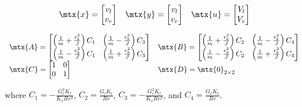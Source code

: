\begin{theorem}
  \label{thm:ramsete_decoupled_ref_tracker}
  \begin{equation*}
    \begin{array}{ccc}
      \mtx{x} =
      \begin{bmatrix}
        v_l \\
        v_r
      \end{bmatrix} &
      \mtx{y} =
      \begin{bmatrix}
        v_l \\
        v_r
      \end{bmatrix} &
      \mtx{u} =
      \begin{bmatrix}
        V_l \\
        V_r
      \end{bmatrix}
    \end{array}
  \end{equation*}

  \begin{equation}
    \begin{array}{ll}
      \mtx{A} =
      \begin{bmatrix}
        \left(\frac{1}{m} + \frac{r_b^2}{J}\right) C_1 &
          \left(\frac{1}{m} - \frac{r_b^2}{J}\right) C_3 \\
        \left(\frac{1}{m} - \frac{r_b^2}{J}\right) C_1 &
          \left(\frac{1}{m} + \frac{r_b^2}{J}\right) C_3
      \end{bmatrix} &
      \mtx{B} =
      \begin{bmatrix}
        \left(\frac{1}{m} + \frac{r_b^2}{J}\right) C_2 &
          \left(\frac{1}{m} - \frac{r_b^2}{J}\right) C_4 \\
        \left(\frac{1}{m} - \frac{r_b^2}{J}\right) C_2 &
          \left(\frac{1}{m} + \frac{r_b^2}{J}\right) C_4
      \end{bmatrix} \\
      \mtx{C} =
      \begin{bmatrix}
        1 & 0 \\
        0 & 1 \\
      \end{bmatrix} &
      \mtx{D} = \mtx{0}_{2 \times 2}
    \end{array}
  \end{equation}

  where $C_1 = -\frac{G_l^2 K_t}{K_v R r^2}$, $C_2 = \frac{G_l K_t}{Rr}$,
  $C_3 = -\frac{G_r^2 K_t}{K_v R r^2}$, and $C_4 = \frac{G_r K_t}{Rr}$.
\end{theorem}

